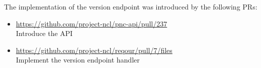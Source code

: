 \documentclass[../main.tex]{subfiles}
\begin{document}
The implementation of the version endpoint was introduced by the following PRs:
\begin{itemize}
    \item \url{https://github.com/project-ncl/pnc-api/pull/237}\\
    Introduce the API

    \item \url{https://github.com/project-ncl/reqour/pull/7/files}\\
    Implement the version endpoint handler
\end{itemize}
\end{document}
